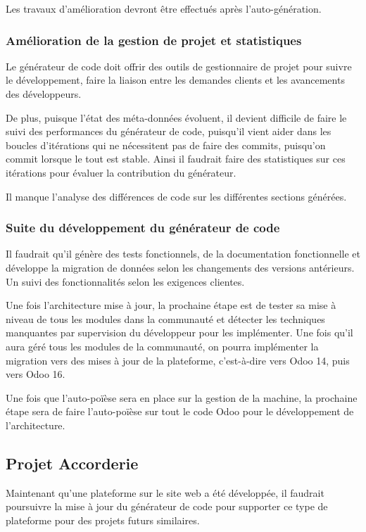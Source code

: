 Les travaux d’amélioration devront être effectués après l’auto-génération.

\subsubsection{Amélioration de la gestion de projet et statistiques}

Le générateur de code doit offrir des outils de gestionnaire de projet pour suivre le développement, faire la liaison entre les demandes clients et les avancements des développeurs.

De plus, puisque l’état des méta-données évoluent, il devient difficile de faire le suivi des performances du générateur de code, puisqu’il vient aider dans les boucles d’itérations qui ne nécessitent pas de faire des commits, puisqu’on commit lorsque le tout est stable. Ainsi il faudrait faire des statistiques sur ces itérations pour évaluer la contribution du générateur.

Il manque l’analyse des différences de code sur les différentes sections générées.

\subsubsection{Suite du développement du générateur de code}

Il faudrait qu’il génère des tests fonctionnels, de la documentation fonctionnelle et développe la migration de données selon les changements des versions antérieurs. Un suivi des fonctionnalités selon les exigences clientes.

Une fois l’architecture mise à jour, la prochaine étape est de tester sa mise à niveau de tous les modules dans la communauté et détecter les techniques manquantes par supervision du développeur pour les implémenter. Une fois qu’il aura géré tous les modules de la communauté, on pourra implémenter la migration vers des mises à jour de la plateforme, c’est-à-dire vers Odoo 14, puis vers Odoo 16.

Une fois que l’auto-poïèse sera en place sur la gestion de la machine, la prochaine étape sera de faire l’auto-poïèse sur tout le code Odoo pour le développement de l’architecture.

\subsection{Projet Accorderie}
Maintenant qu’une plateforme sur le site web a été développée, il faudrait poursuivre la mise à jour du générateur de code pour supporter ce type de plateforme pour des projets futurs similaires.


